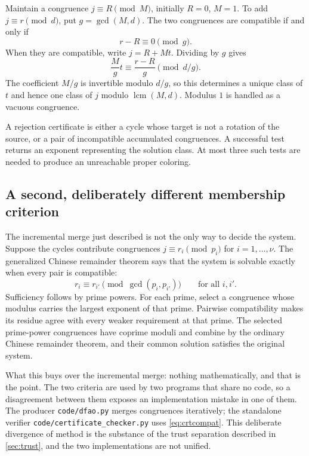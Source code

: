 \documentclass[11pt,a4paper]{article}
\numberwithin{equation}{section}
\theoremstyle{definition}
\theoremstyle{remark}
\newcommand{\lcm}{\operatorname{lcm}}
\begin{document}
Maintain a congruence $j\equiv R\pmod M$, initially $R=0$, $M=1$.
To add $j\equiv r\pmod d$, put $g=\gcd(M,d)$. The two congruences are
compatible if and only if
\[
 r-R\equiv0\pmod g.
\]
When they are compatible, write $j=R+Mt$. Dividing by $g$ gives
\[
 \frac{M}{g}t\equiv\frac{r-R}{g}\pmod{d/g}.
\]
The coefficient $M/g$ is invertible modulo $d/g$, so this determines a unique
class of $t$ and hence one class of $j$ modulo $\lcm(M,d)$. Modulus $1$ is
handled as a vacuous congruence.

A rejection certificate is either a cycle whose target is not a rotation of
the source, or a pair of incompatible accumulated congruences. A successful
test returns an exponent representing the solution class. At most three such
tests are needed to produce an unreachable proper coloring.

\subsection{A second, deliberately different membership
criterion}\label{sec:crtpairwise}

The incremental merge just described is not the only way to decide the
system. Suppose the cycles contribute congruences
$j\equiv r_i\pmod{p_i}$ for $i=1,\ldots,\nu$. The generalized Chinese
remainder theorem says that the system is solvable exactly when every pair is
compatible:
\begin{equation}\label{eq:crtcompat}
 r_i\equiv r_{i'}\pmod{\gcd(p_i,p_{i'})}\qquad\text{for all }i,i'.
\end{equation}
Sufficiency follows by prime powers. For each prime, select a congruence
whose modulus carries the largest exponent of that prime. Pairwise
compatibility makes its residue agree with every weaker requirement at that
prime. The selected prime-power congruences have coprime moduli and combine
by the ordinary Chinese remainder theorem, and their common solution
satisfies the original system.

What this buys over the incremental merge: nothing mathematically, and that
is the point. The two criteria are used by two programs that share no code,
so a disagreement between them exposes an implementation mistake in one of
them. The producer \texttt{code/dfao.py} merges congruences iteratively; the
standalone verifier \texttt{code/certificate\_checker.py} uses
\eqref{eq:crtcompat}. This deliberate divergence of method is the substance
of the trust separation described in \cref{sec:trust}, and the two
implementations are not unified.
\end{document}
